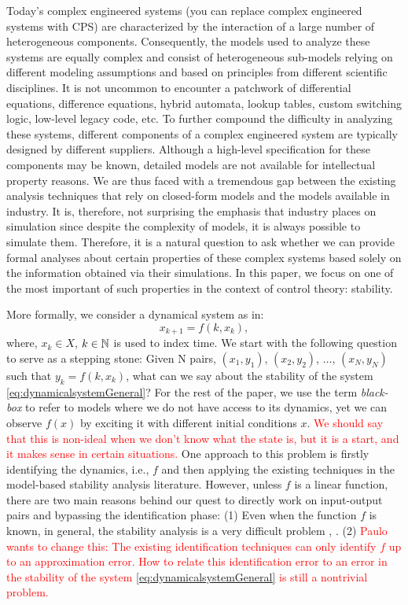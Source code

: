 Today's complex engineered systems (you can replace complex engineered systems with CPS) are characterized by the interaction of a large number of heterogeneous components. Consequently, the models used to analyze these systems are equally complex and consist of heterogeneous sub-models relying on different modeling assumptions and based on principles from different scientific disciplines. It is not uncommon to encounter a patchwork of differential equations, difference equations, hybrid automata, lookup tables, custom switching logic, low-level legacy code, etc. To further compound the difficulty in analyzing these systems, different components of a complex engineered system are typically designed by different suppliers. Although a high-level specification for these components may be known, detailed models are not available for intellectual property reasons. We are thus faced with a tremendous gap between the existing analysis techniques that rely on closed-form models and the models available in industry. It is, therefore, not surprising the emphasis that industry places on simulation since despite the complexity of models, it is always possible to simulate them. Therefore, it is a natural question to ask whether we can provide formal analyses about certain properties of these complex systems based solely on the information obtained via their simulations. In this paper, we focus on one of the most important of such properties in the context of control theory: stability.

More formally, we consider a dynamical system as in:
\begin{equation}\label{eq:dynamicalsystemGeneral}x_{k+1} = f(k, x_k),
\end{equation}
where, $x_k \in X$, $k \in \mathbb{N}$ is used to index time.
We start with the following question to serve as a stepping stone: Given N pairs, $(x_1, y_1)$, $(x_2, y_2)$, $\ldots$, $(x_N, y_N)$ such that $y_{k} = f(k, x_k)$, what can we say about the stability of the system \eqref{eq:dynamicalsystemGeneral}? For the rest of the paper, we use the term \emph{black-box} to refer to models where we do not have access to its dynamics, yet we can observe $f(x)$ by exciting it with different initial conditions $x$. \textcolor{red}{We should say that this is non-ideal when we don't know what the state is, but it is a start, and it makes sense in certain situations.} One approach to this problem is firstly identifying the dynamics, i.e., $f$ and then applying the existing techniques in the model-based stability analysis literature. However, unless $f$ is a linear function, there are two main reasons behind our quest to directly work on input-output pairs and bypassing the identification phase: (1) Even when the function $f$ is known, in general, the stability analysis is a very difficult problem \cite{stabilityHard1}, \cite{stabilityHard2}. (2) \textcolor{red}{Paulo wants to change this: The existing identification techniques can only identify $f$ up to an approximation error. How to relate this identification error to an error in the stability of the system \eqref{eq:dynamicalsystemGeneral} is still a nontrivial problem.}

